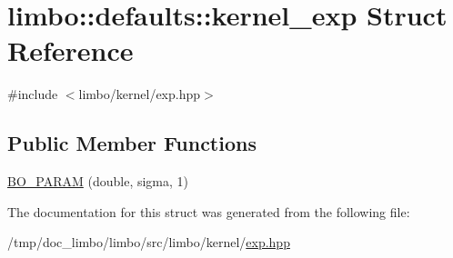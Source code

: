 \hypertarget{structlimbo_1_1defaults_1_1kernel__exp}{}\section{limbo\+:\+:defaults\+:\+:kernel\+\_\+exp Struct Reference}
\label{structlimbo_1_1defaults_1_1kernel__exp}


{\ttfamily \#include $<$limbo/kernel/exp.\+hpp$>$}

\subsection*{Public Member Functions}
\begin{DoxyCompactItemize}
\item 
\hyperlink{group__kernel__defaults_ga14c991dc7de698f2af7a689b157ace9c}{B\+O\+\_\+\+P\+A\+R\+A\+M} (double, sigma, 1)
\end{DoxyCompactItemize}


The documentation for this struct was generated from the following file\+:\begin{DoxyCompactItemize}
\item 
/tmp/doc\+\_\+limbo/limbo/src/limbo/kernel/\hyperlink{exp_8hpp}{exp.\+hpp}\end{DoxyCompactItemize}
